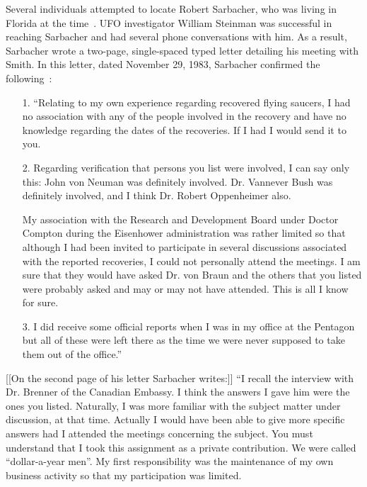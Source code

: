 Several individuals attempted to locate Robert Sarbacher, who was living in Florida at the time~\cite{DolanDisclosure2018Oct}. UFO investigator William Steinman was successful in reaching Sarbacher and had several phone conversations with him. As a result, Sarbacher wrote a two-page, single-spaced typed letter detailing his meeting with Smith. In this letter, dated November 29, 1983, Sarbacher confirmed the following~\cite{Sarbacher-83}:
\begin{svgraybox}
\begin{enumerate}
\item[1.] ``Relating to my own experience regarding recovered flying saucers, I had no
association with any of the people involved in the recovery and have no
knowledge regarding the dates of the recoveries. If I had I would send it to you.
\item[2.] Regarding verification that persons you list were involved, I can say only this:
John von Neuman was definitely involved. Dr. Vannever Bush
was definitely involved, and I think Dr. Robert Oppenheimer also.

My association with the Research and Development Board under Doctor
Compton during the Eisenhower administration was rather limited so that
although I had been invited to participate in several discussions associated with
the reported recoveries, I could not personally attend the meetings. I am sure
that they would have asked Dr. von Braun and the others that you listed were
probably asked and may or may not have attended. This is all I know for sure.

\item[3.] I did receive some official reports when I was in my office at the Pentagon but all
of these were left there as the time we were never supposed to take them out of
the office.''
\end{enumerate}

[[On the second page of his letter Sarbacher writes:]]
``I recall the interview with Dr. Brenner of the Canadian Embassy. I think the answers I
gave him were the ones you listed. Naturally, I was more familiar with the subject
matter under discussion, at that time. Actually I would have been able to give more
specific answers had I attended the meetings concerning the subject. You must
understand that I took this assignment as a private contribution. We were called
``dollar-a-year men''. My first responsibility was the maintenance of my own business
activity so that my participation was limited.


\end{svgraybox}
